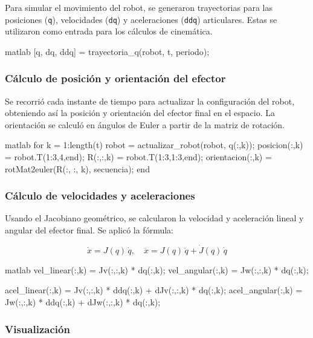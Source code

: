 Para simular el movimiento del robot, se generaron trayectorias para las posiciones (\texttt{q}), velocidades (\texttt{dq}) y aceleraciones (\texttt{ddq}) articulares. Estas se utilizaron como entrada para los cálculos de cinemática.

\begin{matlabcode}{matlab}
	[q, dq, ddq] = trayectoria_q(robot, t, periodo);
\end{matlabcode}

\subsubsection*{Cálculo de posición y orientación del efector}

Se recorrió cada instante de tiempo para actualizar la configuración del robot, obteniendo así la posición y orientación del efector final en el espacio. La orientación se calculó en ángulos de Euler a partir de la matriz de rotación.

\begin{matlabcode}{matlab}
	for k = 1:length(t)
	robot = actualizar_robot(robot, q(:,k));
	posicion(:,k) = robot.T(1:3,4,end);
	R(:,:,k) = robot.T(1:3,1:3,end);
	orientacion(:,k) = rotMat2euler(R(:, :, k), secuencia);
	end
\end{matlabcode}

\subsubsection*{Cálculo de velocidades y aceleraciones}

Usando el Jacobiano geométrico, se calcularon la velocidad y aceleración lineal y angular del efector final. Se aplicó la fórmula:

\[
\dot{x} = J(q)\,\dot{q}, \quad \ddot{x} = J(q)\,\ddot{q} + \dot{J}(q)\,\dot{q}
\]

\begin{matlabcode}{matlab}
	vel_linear(:,k)  = Jv(:,:,k) * dq(:,k); 
	vel_angular(:,k) = Jw(:,:,k) * dq(:,k);  
	
	acel_linear(:,k)  = Jv(:,:,k) * ddq(:,k) + dJv(:,:,k) * dq(:,k); 
	acel_angular(:,k) = Jw(:,:,k) * ddq(:,k) + dJw(:,:,k) * dq(:,k);
\end{matlabcode}

\subsubsection*{Visualización}

